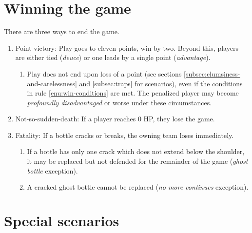 \documentclass[11pt,letterpaper,twocolumn,english,DIV=calc]{scrartcl}
\begin{document}
\section{Winning the game}
There are three ways to end the game.
\begin{enumerate}
	\item \label{enu:win-conditions}Point victory: Play goes to eleven points, win by two.
		Beyond this, players are either tied (\emph{deuce}) or one leads by a single point (\emph{advantage}).
		\begin{enumerate}
			\item Play does not end upon loss of a point (see sections \ref{subsec:clumsiness-and-carelessness} and \ref{subsec:traps} for scenarios), even if the conditions in rule \ref{enu:win-conditions} are met. 
				The penalized player may become \emph{profoundly disadvantaged} or worse under these circumstances.
		\end{enumerate}
	
	\item Not-so-sudden-death: If a player reaches 0 HP, they lose the game.

	\item Fatality: If a bottle cracks or breaks, the owning team loses immediately.
	\begin{enumerate}
		\item If a bottle has only one crack which does not extend below the shoulder, it may be replaced but not defended for the remainder of the game (\emph{ghost bottle} exception).
		\item A cracked ghost bottle cannot be replaced (\emph{no more continues} exception).
	\end{enumerate}
\end{enumerate}

\section{\label{sec:special-scenarios}Special scenarios}
\end{document}
